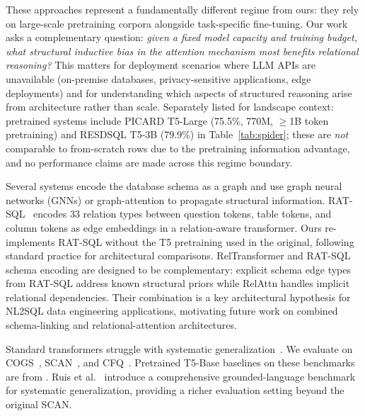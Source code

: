 \documentclass[conference]{IEEEtran}
\begin{document}
These approaches represent a fundamentally different regime from ours: they rely on large-scale pretraining corpora alongside task-specific fine-tuning. Our work asks a complementary question: \emph{given a fixed model capacity and training budget, what structural inductive bias in the attention mechanism most benefits relational reasoning?} This matters for deployment scenarios where LLM APIs are unavailable (on-premise databases, privacy-sensitive applications, edge deployments) and for understanding which aspects of structured reasoning arise from architecture rather than scale. Separately listed for landscape context: pretrained systems include PICARD T5-Large (75.5\%, 770M, $\geq$1B token pretraining) and RESDSQL T5-3B (79.9\%) in Table~\ref{tab:spider}; these are \emph{not} comparable to from-scratch rows due to the pretraining information advantage, and no performance claims are made across this regime boundary.


Several systems encode the database schema as a graph and use graph neural networks (GNNs) or graph-attention to propagate structural information. RAT-SQL~\cite{wang2020ratsql} encodes 33 relation types between question tokens, table tokens, and column tokens as edge embeddings in a relation-aware transformer. Ours re-implements RAT-SQL without the T5 pretraining used in the original, following standard practice for architectural comparisons. RelTransformer and RAT-SQL schema encoding are designed to be complementary: explicit schema edge types from RAT-SQL address known structural priors while RelAttn handles implicit relational dependencies. Their combination is a key architectural hypothesis for NL2SQL data engineering applications, motivating future work on combined schema-linking and relational-attention architectures.

Standard transformers struggle with systematic generalization~\cite{lake2018generalization}. We evaluate on COGS~\cite{kim2020cogs}, SCAN~\cite{lake2018scan,ruis2025neurips}, and CFQ~\cite{keysers2020measuring}. Pretrained T5-Base baselines on these benchmarks are from \cite{furrer2020compositional}. Ruis et al.~\cite{ruis2025neurips} introduce a comprehensive grounded-language benchmark for systematic generalization, providing a richer evaluation setting beyond the original SCAN.
\end{document}
